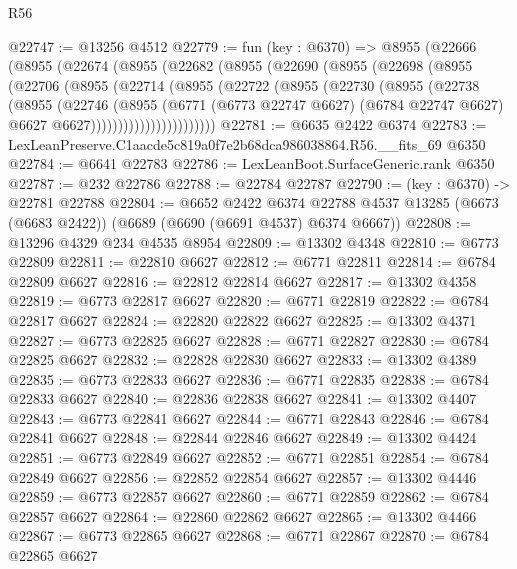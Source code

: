 \begin{lexlean}{R56}
\begin{coremodule}
@22747 := @13256 @4512
@22779 := fun (key : @6370) =>
  @8955
    (@22666
      (@8955
        (@22674
          (@8955
            (@22682
              (@8955
                (@22690
                  (@8955
                    (@22698
                      (@8955
                        (@22706
                          (@8955
                            (@22714
                              (@8955
                                (@22722
                                  (@8955
                                    (@22730
                                      (@8955
                                        (@22738
                                          (@8955
                                            (@22746
                                              (@8955
                                                (@6771
                                                  (@6773 @22747 @6627)
                                                  (@6784 @22747 @6627)
                                                  @6627
                                                  @6627)))))))))))))))))))))))
@22781 := @6635 @2422 @6374
@22783 := LexLeanPreserve.C1aacde5c819a0f7e2b68dca986038864.R56.__fits_69 @6350
@22784 := @6641 @22783
@22786 := LexLeanBoot.SurfaceGeneric.rank @6350
@22787 := @232 @22786
@22788 := @22784 @22787
@22790 := (key : @6370) -> @22781 @22788
@22804 := @6652
    @2422
    @6374
    @22788
    @4537
    @13285
    (@6673 (@6683 @2422))
    (@6689 (@6690 (@6691 @4537) @6374 @6667))
@22808 := @13296 @4329 @234 @4535 @8954
@22809 := @13302 @4348
@22810 := @6773 @22809
@22811 := @22810 @6627
@22812 := @6771 @22811
@22814 := @6784 @22809 @6627
@22816 := @22812 @22814 @6627
@22817 := @13302 @4358
@22819 := @6773 @22817 @6627
@22820 := @6771 @22819
@22822 := @6784 @22817 @6627
@22824 := @22820 @22822 @6627
@22825 := @13302 @4371
@22827 := @6773 @22825 @6627
@22828 := @6771 @22827
@22830 := @6784 @22825 @6627
@22832 := @22828 @22830 @6627
@22833 := @13302 @4389
@22835 := @6773 @22833 @6627
@22836 := @6771 @22835
@22838 := @6784 @22833 @6627
@22840 := @22836 @22838 @6627
@22841 := @13302 @4407
@22843 := @6773 @22841 @6627
@22844 := @6771 @22843
@22846 := @6784 @22841 @6627
@22848 := @22844 @22846 @6627
@22849 := @13302 @4424
@22851 := @6773 @22849 @6627
@22852 := @6771 @22851
@22854 := @6784 @22849 @6627
@22856 := @22852 @22854 @6627
@22857 := @13302 @4446
@22859 := @6773 @22857 @6627
@22860 := @6771 @22859
@22862 := @6784 @22857 @6627
@22864 := @22860 @22862 @6627
@22865 := @13302 @4466
@22867 := @6773 @22865 @6627
@22868 := @6771 @22867
@22870 := @6784 @22865 @6627

\end{coremodule}
\end{lexlean}
